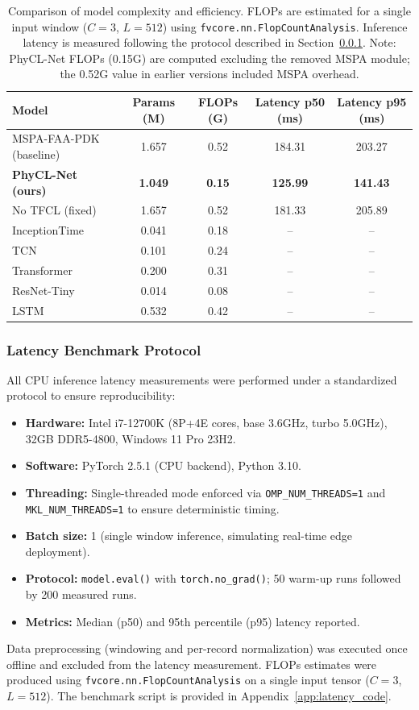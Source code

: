 \documentclass{article}
\begin{document}
\begin{table}[htbp]
\caption{Comparison of model complexity and efficiency. FLOPs are estimated for a single input window ($C=3$, $L=512$) using \texttt{fvcore.nn.FlopCountAnalysis}. Inference latency is measured following the protocol described in Section~\ref{sec:latency_protocol}. Note: PhyCL-Net FLOPs (0.15G) are computed excluding the removed MSPA module; the 0.52G value in earlier versions included MSPA overhead.}
\label{tab:complexity}
\centering
\begin{tabular}{lcccc}
\toprule
Model & Params (M) & FLOPs (G) & Latency p50 (ms) & Latency p95 (ms) \\
\midrule
MSPA-FAA-PDK (baseline) & 1.657 & 0.52 & 184.31 & 203.27 \\
\textbf{PhyCL-Net (ours)} & \textbf{1.049} & \textbf{0.15} & \textbf{125.99} & \textbf{141.43} \\
No TFCL (fixed) & 1.657 & 0.52 & 181.33 & 205.89 \\
\midrule
InceptionTime & 0.041 & 0.18 & -- & -- \\
TCN & 0.101 & 0.24 & -- & -- \\
Transformer & 0.200 & 0.31 & -- & -- \\
ResNet-Tiny & 0.014 & 0.08 & -- & -- \\
LSTM & 0.532 & 0.42 & -- & -- \\
\bottomrule
\end{tabular}
\end{table}

\subsubsection{Latency Benchmark Protocol}
\label{sec:latency_protocol}

All CPU inference latency measurements were performed under a standardized protocol to ensure reproducibility:
\begin{itemize}
    \item \textbf{Hardware:} Intel i7-12700K (8P+4E cores, base 3.6GHz, turbo 5.0GHz), 32GB DDR5-4800, Windows 11 Pro 23H2.
    \item \textbf{Software:} PyTorch 2.5.1 (CPU backend), Python 3.10.
    \item \textbf{Threading:} Single-threaded mode enforced via \texttt{OMP\_NUM\_THREADS=1} and \texttt{MKL\_NUM\_THREADS=1} to ensure deterministic timing.
    \item \textbf{Batch size:} 1 (single window inference, simulating real-time edge deployment).
    \item \textbf{Protocol:} \texttt{model.eval()} with \texttt{torch.no\_grad()}; 50 warm-up runs followed by 200 measured runs.
    \item \textbf{Metrics:} Median (p50) and 95th percentile (p95) latency reported.
\end{itemize}
Data preprocessing (windowing and per-record normalization) was executed once offline and excluded from the latency measurement. FLOPs estimates were produced using \texttt{fvcore.nn.FlopCountAnalysis} on a single input tensor ($C=3$, $L=512$). The benchmark script is provided in Appendix~\ref{app:latency_code}.
\end{document}
